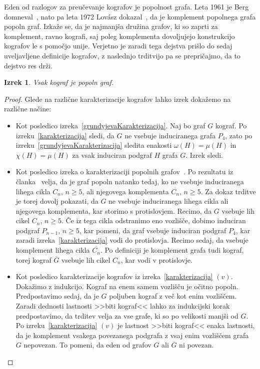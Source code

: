 \documentclass[12pt,a4paper,twoside]{article}
\theoremstyle{definition} %
\theoremstyle{plain} %
\newtheorem{izrek}[definicija]{Izrek}
\numberwithin{equation}{section}  %
\begin{document}
Eden od razlogov za preučevanje kografov je popolnost grafa. Leta 1961 je Berg domneval~\cite{berge1961coloring}, nato pa leta 1972 Lovász dokazal~\cite{lovasz1972characterisation}, da je komplement popolnega grafa popoln graf. Izkaže se, da je najmanjša družina grafov, ki so zaprti za komplement, ravno kografi, saj poleg komplementa dovoljujejo konstrukcijo kografov le s pomočjo unije. Verjetno je zaradi tega dejstva prišlo do sedaj uveljavljene definicije kografov, z naslednjo trditvijo pa se prepričajmo, da to dejstvo res drži.

\pagebreak

\begin{izrek}
Vsak kograf je popoln graf.
\end{izrek} 
\begin{proof}
Glede na različne karakterizacije kografov lahko izrek dokažemo na različne načine:
\begin{itemize}
\item Kot posledico izreka~\ref{grundyjevaKarakterizacija}. Naj bo graf $G$ kograf. Po izreku~\ref{karakterizacija} sledi, da $G$ ne vsebuje induciranega grafa $P_4$, zato po izreku~\ref{grundyjevaKarakterizacija} sledita enakosti $\omega(H)=\mu(H)$ in $\chi(H)=\mu(H)$ za vsak induciran podgraf $H$ grafa $G$. Izrek sledi.

\item Kot posledico izreka o karakterizaciji popolnih grafov~\cite{chudnovsky2006strong}. Po rezultatu iz članka~\cite{chudnovsky2006strong} velja, da je graf popoln natanko tedaj, ko ne vsebuje induciranega lihega cikla $C_n$, $n \geq 5$, ali njegovega komplementa $\overline{C_n}$, $n \geq 5$. Za dokaz trditve je torej dovolj pokazati, da $G$ ne vsebuje induciranega lihega cikla ali njegovega komplementa, kar storimo s protislovjem. Recimo, da $G$ vsebuje lih cikel $C_n$, $n \geq 5$. Če iz tega cikla odstranimo eno vozlišče, dobimo induciran podgraf $P_{n-1}$, $n\geq 5$, kar pomeni, da graf vsebuje induciran podgraf $P_4$, kar zaradi izreka~\ref{karakterizacija} vodi do protislovja. Recimo sedaj, da vsebuje komplement lihega cikla $\overline{C_n}$. Po definiciji je komplement grafa tudi kograf, torej kograf $\overline{G}$ vsebuje lih cikel $C_n$, kar vodi v protislovje.

\item Kot posledico karakterizacije kografov iz izreka~\ref{karakterizacija} $(v)$. Dokažimo z indukcijo. Kograf na enem samem vozlišču je očitno popoln. Predpostavimo sedaj, da je $G$ poljuben kograf z več kot enim vozliščem. Zaradi dednosti lastnosti >>biti kograf<< lahko za indukcijski korak predpostavimo, da trditev velja za vse grafe, ki so po velikosti manjši od $G$. Po izreku~\ref{karakterizacija} $(v)$ je lastnost >>biti kograf<< enaka lastnosti, da je komplement vsakega povezanega podgrafa z vsaj enim vozliščem grafa $G$ nepovezan. To pomeni, da eden od grafov $G$ ali $\overline{G}$ ni povezan.


\end{itemize}
\end{proof}
\end{document}
